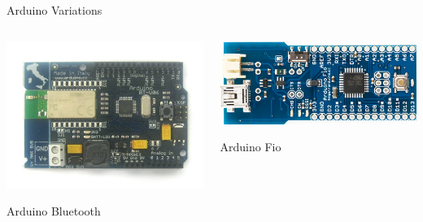 \documentclass{beamer}
\begin{document}
\begin{frame}{Arduino Variations}
  \begin{columns}
    \begin{column}{0.5\textwidth}
      \pause
      \centerline{\includegraphics[width=.95\textwidth]{ArduinoBT400.jpg}}
      \centerline{Arduino Bluetooth}
    \end{column}
    \begin{column}{0.5\textwidth}
      \pause
      \centerline{\includegraphics[width=.95\textwidth]{ArduinoFio.jpg}}
      \centerline{Arduino Fio}
    \end{column}
  \end{columns}
\end{frame}
\end{document}
